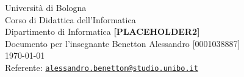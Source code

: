 \documentclass[../../main.tex]{subfiles}
\begin{document}
\begin{titlepage}
    \begin{center}
    {
        \LARGE{
            Università di Bologna \\ [1ex]
            Corso di Didattica dell'Informatica \\ Dipartimento di Informatica
        }
        \vfill
        {\huge
            \textbf{[PLACEHOLDER2]}
        }
        \\ [1ex]
        {\large 
            Documento per l'insegnante
        }
        \vfill
        {\large   
            Benetton Alessandro [0001038887]\\[0.75ex]
            
        \vfill
        \today
        \\[4ex]
        Referente: \href{mailto:alessandro.benetton@studio.unibo.it}{\tt alessandro.benetton@studio.unibo.it}
        }
    }
    \end{center}
\end{titlepage}
\end{document}
